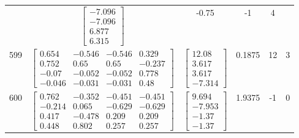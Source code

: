 \documentclass[a4paper,12pt]{article}
\begin{document}
\begin{tabular}{c c c c c c}
&
$\begin{bmatrix} -7.096 \\ -7.096 \\ 6.877 \\ 6.315 \end{bmatrix}$
&
-0.75
&
-1
&
4
\\
599
&
$\begin{bmatrix} 0.654 & -0.546 & -0.546 & 0.329 \\ 0.752 & 0.65 & 0.65 & -0.237 \\ -0.07 & -0.052 & -0.052 & 0.778 \\ -0.046 & -0.031 & -0.031 & 0.48 \end{bmatrix}$
&
$\begin{bmatrix} 12.08 \\ 3.617 \\ 3.617 \\ -7.314 \end{bmatrix}$
&
0.1875
&
12
&
3
\\
600
&
$\begin{bmatrix} 0.762 & -0.352 & -0.451 & -0.451 \\ -0.214 & 0.065 & -0.629 & -0.629 \\ 0.417 & -0.478 & 0.209 & 0.209 \\ 0.448 & 0.802 & 0.257 & 0.257 \end{bmatrix}$
&
$\begin{bmatrix} 9.694 \\ -7.953 \\ -1.37 \\ -1.37 \end{bmatrix}$
&
1.9375
&
-1
&
0
\\
\end{tabular} \egroup \newpage
\end{document}
